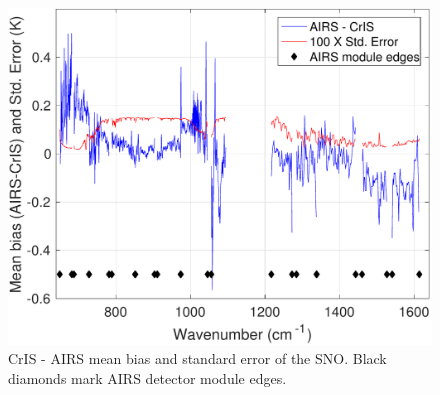 \documentclass[twocolumn,10pt]{article}
\begin{document}
\begin{figure}[htb]
  \centering
  \includegraphics[width=\linewidth]{./figs/ac_jpl_sno_bias_stderr_lw_mw_mod_gaps_markers.pdf}
  \caption{CrIS - AIRS mean bias and standard error of the SNO. Black diamonds mark AIRS detector module edges.}
  \label{fig:Y6}
\end{figure}



\end{document}

